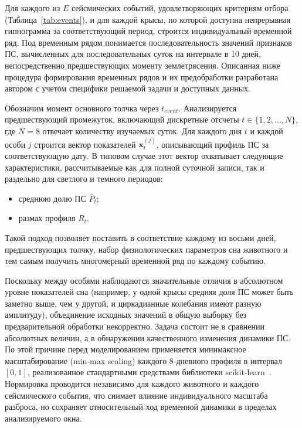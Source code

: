 \documentclass[14pt]{mmcs_article}
\begin{document}
Для каждого из $E$ сейсмических событий, удовлетворяющих
критериям отбора (Таблица~\ref{tab:events}), и для каждой
крысы, по которой доступна непрерывная гипнограмма за
соответствующий период, строится индивидуальный временной
ряд. Под временным рядом понимается последовательность
значений признаков ПС, вычисленных для последовательных
суток на интервале в 10 дней, непосредственно предшествующих
моменту землетрясения. Описанная ниже процедура формирования
временных рядов и их предобработки разработана автором с
учетом специфики решаемой задачи и доступных данных.

Обозначим момент основного толчка через $t_{event}$.
Анализируется предшествующий промежуток, включающий
дискретные отсчеты $t \in \{1, 2, \ldots, N\}$, где
$N=8$ отвечает количеству изучаемых суток. Для каждого
дня $t$ и каждой особи $j$ строится вектор показателей
$\mathbf{x}_t^{(j)}$, описывающий профиль ПС за
соответствующую дату. В типовом случае этот вектор
охватывает следующие характеристики, рассчитываемые как
для полной суточной записи, так и раздельно для светлого
и темного периодов:
\begin{itemize}
	\item среднюю долю ПС $\bar{P}_t$;
	\item размах профиля $R_t$.
\end{itemize}

Такой подход позволяет поставить в соответствие каждому
из восьми дней, предшествующих толчку, набор
физиологических параметров сна животного и тем самым
получить многомерный временной ряд по каждому событию.

Поскольку между особями наблюдаются значительные отличия
в абсолютном уровне показателей сна (например, у одной
крысы средняя доля ПС может быть заметно выше, чем у
другой, и циркадианные колебания имеют разную
амплитуду), объединение исходных значений в общую
выборку без предварительной обработки некорректно.
Задача состоит не в сравнении абсолютных величин, а в
обнаружении качественного изменения динамики ПС. По этой
причине перед моделированием применяется минимаксное
масштабирование (min-max scaling) каждого 8-дневного
профиля в интервал $[0, 1]$, реализованное стандартными
средствами библиотеки scikit-learn~\cite{scikit-learn}.
Нормировка проводится независимо для каждого животного и
каждого сейсмического события, что снимает влияние
индивидуального масштаба разброса, но сохраняет
относительный ход временной динамики в пределах
анализируемого окна.
\end{document}
